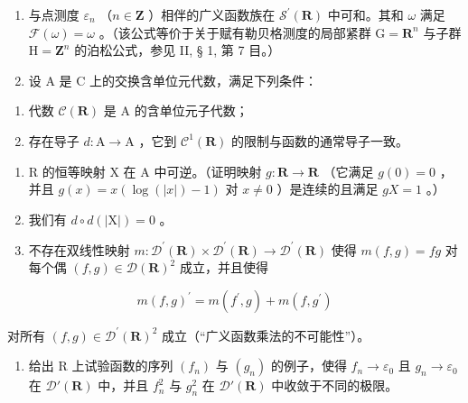 \begin{enumerate}
\def\labelenumi{\arabic{enumi})}
\setcounter{enumi}{4}
\item
  与点测度 \(\varepsilon_{n}\) （\(n\in\mathbf{Z}\) ）相伴的广义函数族在 \(\mathcal{S}^{\prime}(\mathbf{R})\) 中可和。其和 \(\omega\) 满足 \(\mathcal{F}(\omega)=\omega\) 。（该公式等价于关于赋有勒贝格测度的局部紧群 \(\mathrm{G}=\mathbf{R}^{n}\) 与子群 \(\mathrm{H}=\mathbf{Z}^{n}\) 的泊松公式，参见 II, § 1, 第 7 目。）
\item
  设 A 是 C 上的交换含单位元代数，满足下列条件：
\end{enumerate}

\begin{enumerate}
\def\labelenumi{(\roman{enumi})}
\item
  代数 \(\mathcal{C}(\mathbf{R})\) 是 A 的含单位元子代数；
\item
  存在导子 \(d\colon\mathrm{A}\to\mathrm{A}\) ，它到 \(\mathcal{C}^{1}(\mathbf{R})\) 的限制与函数的通常导子一致。
\end{enumerate}

\begin{enumerate}
\def\labelenumi{\alph{enumi})}
\item
  R 的恒等映射 X 在 A 中可逆。（证明映射 \(g: \mathbf{R} \to \mathbf{R}\) （它满足 \(g(0) = 0\) ，并且 \(g(x) = x(\log(|x|) - 1)\) 对 \(x \neq 0\) ）是连续的且满足 \(gX = 1\) 。）
\item
  我们有 \(d \circ d(|\mathrm{X}|) = 0\) 。
\item
  不存在双线性映射 \(m\colon\mathcal{D}^{\prime}(\mathbf{R})\times\mathcal{D}^{\prime}(\mathbf{R})\to\mathcal{D}^{\prime}(\mathbf{R})\) 使得 \(m(f,g)=fg\) 对每个偶 \((f,g)\in\mathcal{D}(\mathbf{R})^{2}\) 成立，并且使得
\end{enumerate}

\[
m (f, g) ^ {\prime} = m \left(f ^ {\prime}, g\right) + m \left(f, g ^ {\prime}\right)
\]

对所有 \((f,g)\in\mathcal{D}^{\prime}(\mathbf{R})^{2}\) 成立（“广义函数乘法的不可能性”）。

\begin{enumerate}
\def\labelenumi{\alph{enumi})}
\setcounter{enumi}{3}
\tightlist
\item
  给出 R 上试验函数的序列 \((f_{n})\) 与 \((g_{n})\) 的例子，使得 \(f_{n} \to \varepsilon_{0}\) 且 \(g_{n} \to \varepsilon_{0}\) 在 \(\mathcal{D}'(\mathbf{R})\) 中，并且 \(f_{n}^{2}\) 与 \(g_{n}^{2}\) 在 \(\mathcal{D}'(\mathbf{R})\) 中收敛于不同的极限。
\end{enumerate}

